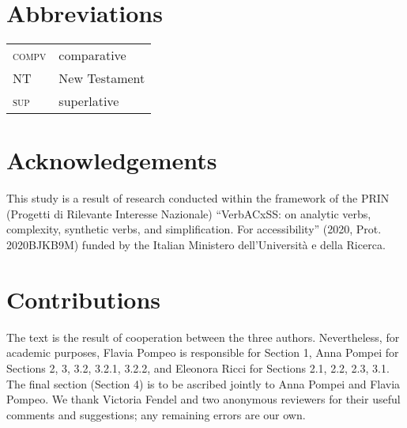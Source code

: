 \documentclass[output=paper,colorlinks,citecolor=brown]{langscibook}
\begin{document}

\section*{Abbreviations}
\begin{tabularx}{.5\textwidth}{@{}lQ@{}}
\textsc{compv} & comparative \\
NT & New Testament \\
\textsc{sup} & superlative \\
\end{tabularx}

\section*{Acknowledgements}
This study is a result of research conducted within the framework of the PRIN (Progetti di Rilevante Interesse Nazionale) ``VerbACxSS: on analytic verbs, complexity, synthetic verbs, and simplification. For accessibility'' (2020, Prot. 2020\-BJKB9M) funded by the Italian Ministero dell’Università e della Ricerca. 

\section*{Contributions}
The text is the result of cooperation between the three authors. Nevertheless, for academic purposes, Flavia Pompeo is responsible for Section 1, Anna Pompei for Sections 2, 3, 3.2, 3.2.1, 3.2.2, and Eleonora Ricci for Sections 2.1, 2.2, 2.3, 3.1. The final section (Section 4) is to be ascribed jointly to Anna Pompei and Flavia Pompeo. We thank Victoria Fendel and two anonymous reviewers for their useful comments and suggestions; any remaining errors are our own.

\sloppy
\printbibliography[heading=subbibliography,notkeyword=this]
\end{document}
